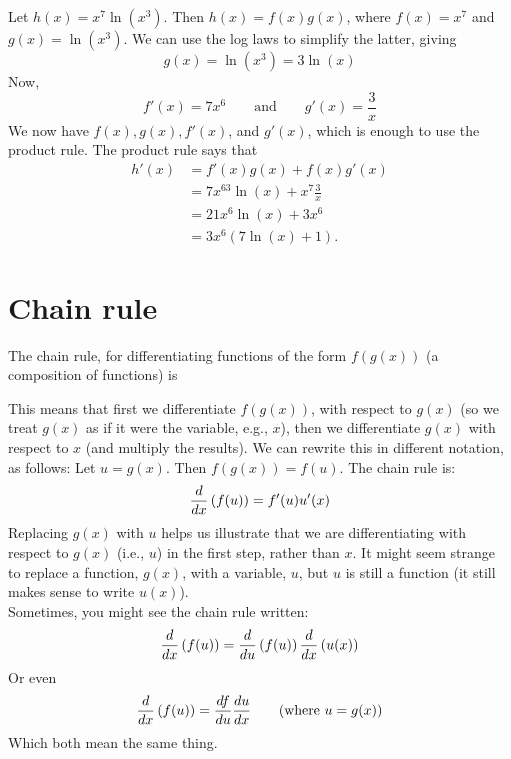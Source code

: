 \solution
Let $h(x)= x^7\ln(x^3)$. Then $h(x) = f(x)g(x)$, where $f(x) = x^7$ and $g(x) = \ln(x^3)$. We can use the log laws to simplify the latter, giving 
\[
g(x) = \ln(x^3) = 3\ln(x) \tag{logarithm laws}
\]
Now,
\[
f'(x) = 7x^6 \qquad \text{and} \qquad g'(x) = \frac{3}{x} \tag{using derivative formulas}
\]
We now have $f(x),g(x),f'(x)$, and $g'(x)$, which is enough to use the product rule. The product rule says that
\begin{align*}
h'(x) & = f'(x)g(x) + f(x)g'(x) \\
	& = 7x^63\ln(x) + x^7 \frac{3}{x} \tag{plugging in our results} \\
	& = 21x^6\ln(x) + 3x^6 \\
	& = 3x^6(7\ln(x) + 1). \tag{factorising}
\end{align*}

\section{Chain rule} \label{chain rule}
The chain rule, for differentiating functions of the form $f(g(x))$ (a composition of functions) is

  	\bigskip
	
	\hfil{}
	\bigskip
	
\noindent This means that first we differentiate $f(g(x))$, with respect to $g(x)$ (so we treat $g(x)$ as if it were the variable, e.g., $x$), then we differentiate $g(x)$ with respect to $x$ (and multiply the results). We can rewrite this in different notation, as follows: Let $u = g(x)$. Then $f(g(x)) = f(u)$. The chain rule is:
\[
\frac{d}{dx}\left(f(u)\right) = f'(u)u'(x)
\]
Replacing $g(x)$ with $u$ helps us illustrate that we are differentiating with respect to $g(x)$ (i.e., $u$) in the first step, rather than $x$. It might seem strange to replace a function, $g(x)$, with a variable, $u$, but $u$ is still a function (it still makes sense to write $u(x)$). \\
Sometimes, you might see the chain rule written:
\[
\frac{d}{dx}\left(f(u)\right) = \frac{d}{du}\left(f(u)\right)\frac{d}{dx}\left(u(x)\right)
\]
Or even
\[
\frac{d}{dx}\left(f(u)\right) = \frac{df}{du}\frac{du}{dx} \tag{where $u = g(x)$}
\]
Which both mean the same thing. \\

